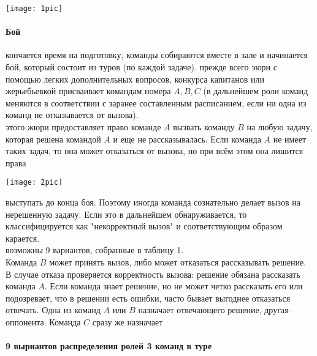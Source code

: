\begin{minipage}[t]{0.4\textwidth}
\parindent=0.6cm
\begin{center}
\texttt{[image: 1pic]} 
\end{center}
\begin{center}
   \paragraph{Бой} 
\end{center}
 кончается время на подготовку, команды собираются вместе в зале и начинается бой, который состоит из туров (по каждой задаче). прежде всего эюри с помощью легких дополнительных вопросов, конкурса капитанов или жерьебьевкой присваивает командам номера $A, B, C$ (в дальнейшем роли команд меняются в соответствии с заранее составленным расписанием, если ни одна из команд не отказывается от вызова). \\  этого жюри предоставляет право команде $A$ вызвать команду $B$ на любую задачу, которая решена командой $A$ и еще не рассказывалась. Если команда $A$ не имеет таких задач, то она может отказаться от вызова, но при всём этом она лишится права\\
\end{minipage}%
\hfill
\hfill
\begin{minipage}[t]{0.4\textwidth}
\parindent=0.6cm
\begin{center}
\texttt{[image: 2pic]} \\
\end{center}
выступать до конца боя. Поэтому иногда команда сознательно делает вызов на нерешенную задачу. Если это в дальнейшем обнаруживается, то классифицируется как "некорректный вызов" и соответствующим образом карается.\\
 возможны 9 вариантов, собранные в таблицу 1. \\ \indent
Команда $B$ может принять вызов, либо может отказаться рассказывать решение. В случае отказа проверяется корректность вызова: решение обязана рассказать команда $A$. Если команда знает решение, но не может четко рассказать его или подозревает, что в решении есть ошибки, часто бывает выгоднее отказаться отвечать. Одна из команд $A$ или $B$ назначает отвечающего решение, другая--оппонента. Команда $C$ сразу же назначает
\end{minipage}

\begin{center}
\paragraph{9 выриантов распределения ролей 3 команд в туре } \\
\end{center}


